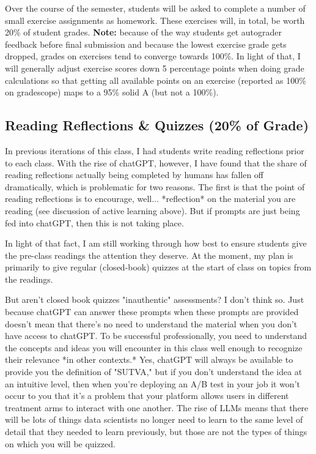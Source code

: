 \documentclass[12pt]{article}
\begin{document}
Over the course of the semester, students will be asked to complete a number of small exercise assignments as homework. These exercises will, in total, be worth 20\% of student grades.  \textbf{Note:} because of the way students get autograder feedback before final submission and because the lowest exercise grade gets dropped, grades on exercises tend to converge towards 100\%. In light of that, I will generally adjust exercise scores down 5 percentage points when doing grade calculations so that getting all available points on an exercise (reported as 100\% on gradescope) maps to a 95\% solid A (but not a 100\%).

\subsection{Reading Reflections \& Quizzes (20\% of Grade)}

In previous iterations of this class, I had students write reading reflections prior to each class. With the rise of chatGPT, however, I have found that the share of reading reflections actually being completed by humans has fallen off dramatically, which is problematic for two reasons. The first is that the point of reading reflections is to encourage, well... *reflection* on the material you are reading (see discussion of active learning above). But if prompts are just being fed into chatGPT, then this is not taking place.

In light of that fact, I am still working through how best to ensure students give the pre-class readings the attention they deserve. At the moment, my plan is primarily to give regular (closed-book) quizzes at the start of class on topics from the readings.

But aren't closed book quizzes "inauthentic" assessments? I don't think so. Just because chatGPT can answer these prompts when these prompts are provided doesn't mean that there's no need to understand the material when you don't have access to chatGPT. To be successful professionally, you need to understand the concepts and ideas you will encounter in this class well enough to recognize their relevance *in other contexts.* Yes, chatGPT will always be available to provide you the definition of "SUTVA," but if you don't understand the idea at an intuitive level, then when you're deploying an A/B test in your job it won't occur to you that it's a problem that your platform allows users in different treatment arms to interact with one another. The rise of LLMs means that there will be lots of things data scientists no longer need to learn to the same level of detail that they needed to learn previously, but those are not the types of things on which you will be quizzed.
\end{document}
